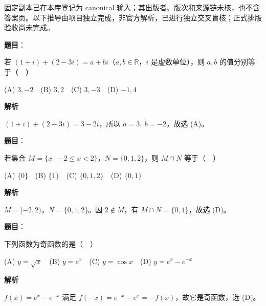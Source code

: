 

\begin{gktip}
固定副本已在本库登记为 canonical 输入；其出版者、版次和来源链未核，也不含答案页。以下推导由项目独立完成，非官方解析，已进行独立交叉盲核；正式排版验收尚未完成。
\end{gktip}

\begin{answer}

\textbf{题目}：

若 \((1+i)+(2-3i)=a+bi\)（\(a,b\in\mathbb R\)，\(i\) 是虚数单位），则 \(a,b\) 的值分别等于（　）

(A) \(3,-2\)　(B) \(3,2\)　(C) \(3,-3\)　(D) \(-1,4\)

\textbf{解析}

\((1+i)+(2-3i)=3-2i\)，所以 \(a=3,\ b=-2\)，故选 (A)。


\end{answer}
\begin{answer}

\textbf{题目}：

若集合 \(M=\{x\mid -2\leqslant x<2\}\)，\(N=\{0,1,2\}\)，则 \(M\cap N\) 等于（　）

(A) \(\{0\}\)　(B) \(\{1\}\)　(C) \(\{0,1,2\}\)　(D) \(\{0,1\}\)

\textbf{解析}

\(M=[-2,2)\)，\(N=\{0,1,2\}\)。因 \(2\notin M\)，有 \(M\cap N=\{0,1\}\)，故选 (D)。


\end{answer}
\begin{answer}

\textbf{题目}：

下列函数为奇函数的是（　）

(A) \(y=\sqrt{x}\)　(B) \(y=e^x\)　(C) \(y=\cos x\)　(D) \(y=e^x-e^{-x}\)

\textbf{解析}

\(f(x)=e^x-e^{-x}\) 满足 \(f(-x)=e^{-x}-e^x=-f(x)\)，故它是奇函数，选 (D)。


\end{answer}
